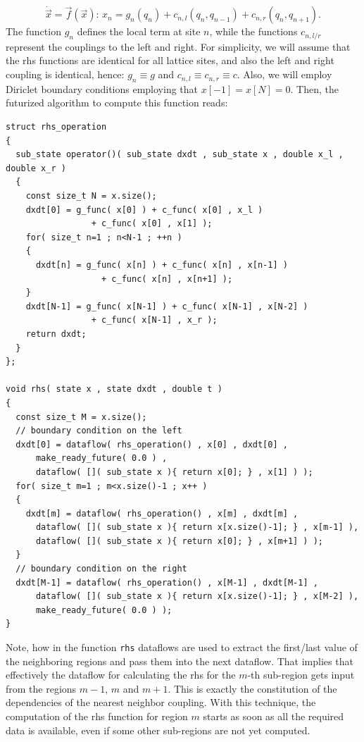 \documentclass[a4wide,10pt]{scrartcl}
\begin{document}
\begin{equation}
 \dot{\vec x} = \vec f(\vec x):\, x_n = g_n(q_n) + c_{n,l}(q_{n},q_{n-1}) + c_{n,r}(q_{n},q_{n+1}).
\end{equation} 
The function $g_n$ defines the local term at site $n$, while the functions $c_{n,l/r}$ represent the couplings to the left and right.
For simplicity, we will assume that the rhs functions are identical for all lattice sites, and also the left and right coupling is identical, hence: $g_n \equiv g$ and $c_{n,l} \equiv c_{n,r} \equiv c$.
Also, we will employ Diriclet boundary conditions employing that $x[-1] = x[N] = 0$.
Then, the futurized algorithm to compute this function reads:
\begin{lstlisting}
struct rhs_operation
{
  sub_state operator()( sub_state dxdt , sub_state x , double x_l , double x_r )
  {
    const size_t N = x.size();
    dxdt[0] = g_func( x[0] ) + c_func( x[0] , x_l ) 
			     + c_func( x[0] , x[1] );
    for( size_t n=1 ; n<N-1 ; ++n )
    {
      dxdt[n] = g_func( x[n] ) + c_func( x[n] , x[n-1] ) 
			       + c_func( x[n] , x[n+1] );
    }
    dxdt[N-1] = g_func( x[N-1] ) + c_func( x[N-1] , x[N-2] ) 
				 + c_func( x[N-1] , x_r );
    return dxdt;
  }
};

void rhs( state x , state dxdt , double t )
{
  const size_t M = x.size();
  // boundary condition on the left
  dxdt[0] = dataflow( rhs_operation() , x[0] , dxdt[0] , 
      make_ready_future( 0.0 ) ,
      dataflow( []( sub_state x ){ return x[0]; } , x[1] ) );
  for( size_t m=1 ; m<x.size()-1 ; x++ )
  {
    dxdt[m] = dataflow( rhs_operation() , x[m] , dxdt[m] , 
      dataflow( []( sub_state x ){ return x[x.size()-1]; } , x[m-1] ),
      dataflow( []( sub_state x ){ return x[0]; } , x[m+1] ) );
  }
  // boundary condition on the right
  dxdt[M-1] = dataflow( rhs_operation() , x[M-1] , dxdt[M-1] , 
      dataflow( []( sub_state x ){ return x[x.size()-1]; } , x[M-2] ),
      make_ready_future( 0.0 ) );
}
\end{lstlisting}
Note, how in the function \lstinline+rhs+ dataflows are used to extract the first/last value of the neighboring regions and pass them into the next dataflow.
That implies that effectively the dataflow for calculating the rhs for the $m$-th sub-region gets input from the regions $m-1$, $m$ and $m+1$.
This is exactly the constitution of the dependencies of the nearest neighbor coupling.
With this technique, the computation of the rhs function for region $m$ starts as soon as all the required data is available, even if some other sub-regions are not yet computed.
\end{document}

